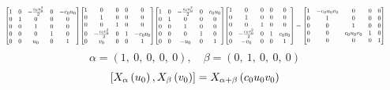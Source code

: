 \documentclass[11pt]{article}
\theoremstyle{definition}
\begin{document}
\[
\scaletoalign{\textwidth}{{\left[\begin{matrix}1 & 0 & - \frac{c_{0} u_{0}^{2}}{2} & 0 & - c_{0} u_{0}\\0 & 1 & 0 & 0 & 0\\0 & 0 & 1 & 0 & 0\\0 & 0 & 0 & 1 & 0\\0 & 0 & u_{0} & 0 & 1\end{matrix}\right]} {\left[\begin{matrix}1 & 0 & 0 & 0 & 0\\0 & 1 & 0 & 0 & 0\\0 & 0 & 1 & 0 & 0\\0 & - \frac{c_{0} v_{0}^{2}}{2} & 0 & 1 & - c_{0} v_{0}\\0 & v_{0} & 0 & 0 & 1\end{matrix}\right]} {\left[\begin{matrix}1 & 0 & - \frac{c_{0} u_{0}^{2}}{2} & 0 & c_{0} u_{0}\\0 & 1 & 0 & 0 & 0\\0 & 0 & 1 & 0 & 0\\0 & 0 & 0 & 1 & 0\\0 & 0 & - u_{0} & 0 & 1\end{matrix}\right]} {\left[\begin{matrix}1 & 0 & 0 & 0 & 0\\0 & 1 & 0 & 0 & 0\\0 & 0 & 1 & 0 & 0\\0 & - \frac{c_{0} v_{0}^{2}}{2} & 0 & 1 & c_{0} v_{0}\\0 & - v_{0} & 0 & 0 & 1\end{matrix}\right]} = {\left[\begin{matrix}1 & - c_{0} u_{0} v_{0} & 0 & 0 & 0\\0 & 1 & 0 & 0 & 0\\0 & 0 & 1 & 0 & 0\\0 & 0 & c_{0} u_{0} v_{0} & 1 & 0\\0 & 0 & 0 & 0 & 1\end{matrix}\right]}}
\]
\[
\alpha = \left( 1, \  0, \  0, \  0, \  0\right), \quad \beta = \left( 0, \  1, \  0, \  0, \  0\right)
\]
\[
\scaletoalign{\textwidth}{\left[ X_{\alpha}\left(u_{0}\right), X_{\beta}\left(v_{0}\right) \right] = X_{\alpha + \beta}\left(c_{0} u_{0} v_{0}\right)}
\]
\end{document}
